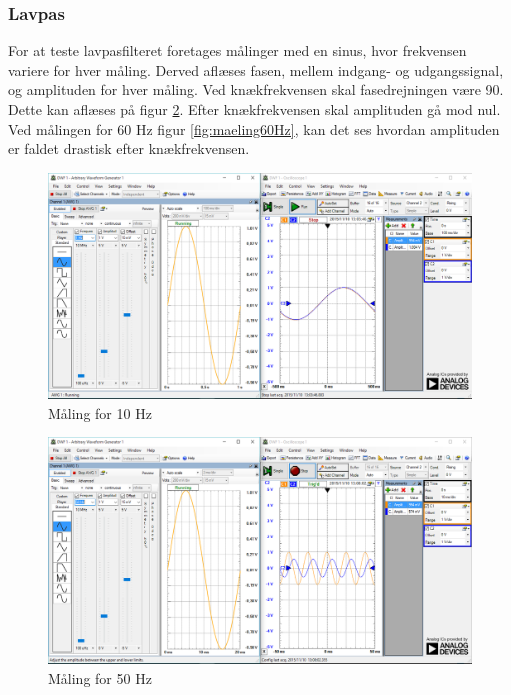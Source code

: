\subsubsection{Lavpas}
For at teste lavpasfilteret foretages målinger med en sinus, hvor frekvensen variere for hver måling. Derved aflæses fasen, mellem indgang- og udgangssignal, og amplituden for hver måling. 
Ved knækfrekvensen skal fasedrejningen være 90\textdegree. Dette kan aflæses på figur \ref{fig:maeling50Hz}.
Efter knækfrekvensen skal amplituden gå mod nul. Ved målingen for 60 Hz figur \ref{fig:maeling60Hz}, kan det ses hvordan amplituden er faldet drastisk efter knækfrekvensen. 
\begin{figure}[H]
	\centering
	\includegraphics[width=1.0\textwidth]{Figurer/10Hz}
	\caption{Måling for 10 Hz}
	\label{fig:maeling10Hz}
\end{figure}

\begin{figure}[H]
	\centering
	\includegraphics[width=1.0\textwidth]{Figurer/50Hz}
	\caption{Måling for 50 Hz}
	\label{fig:maeling50Hz}
\end{figure}

